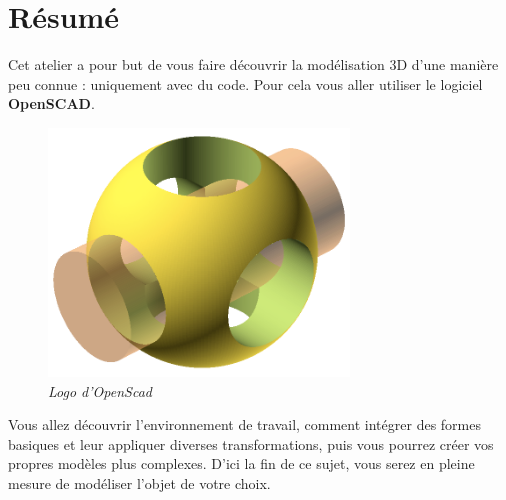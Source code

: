 \section{Résumé}

Cet atelier a pour but de vous faire découvrir la modélisation 3D d'une manière peu connue : uniquement avec du code.
Pour cela vous aller utiliser le logiciel \textbf{OpenSCAD}.

\vspace{10pt}

\begin{figure}[h]
	\centering
	\includegraphics[width=8cm]{images/logo-openscad.png}
	\caption{\textit{Logo d'OpenScad}}
\end{figure}

\vspace{10pt}

Vous allez découvrir l'environnement de travail, comment intégrer des formes basiques et leur appliquer diverses transformations, puis vous pourrez créer vos propres modèles plus complexes.
D'ici la fin de ce sujet, vous serez en pleine mesure de modéliser l'objet de votre choix.